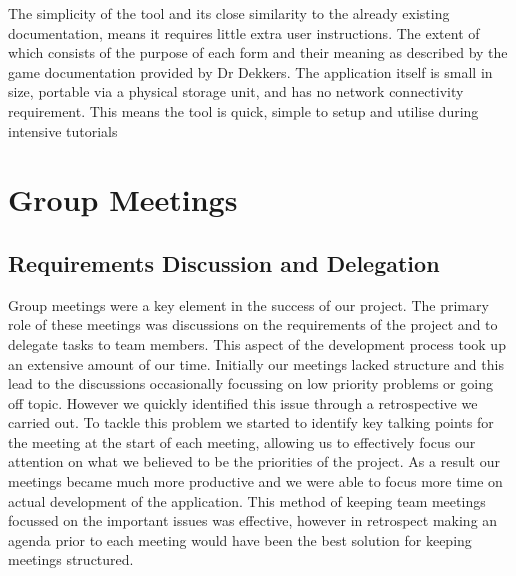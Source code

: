 \documentclass{l3proj}
\begin{document}
The simplicity of the tool and its close similarity to the already existing documentation, means it requires little extra user instructions. The extent of which consists of the purpose of each form and their meaning as described by the game documentation provided by Dr Dekkers. The application itself is small in size, portable via a physical storage unit, and has no network connectivity requirement. This means the tool is quick, simple to setup and utilise during intensive tutorials
\section{Group Meetings}
\label{sec:groupmeetings}
\subsection{Requirements Discussion and Delegation}
Group meetings were a key element in the success of our project. The primary role of these meetings was discussions on the requirements of the project and to delegate tasks to team members. This aspect of the development process took up an extensive amount of our time. Initially our meetings lacked structure and this lead to the discussions occasionally focussing on low priority problems or going off topic. However we quickly identified this issue through a retrospective we carried out. To tackle this problem we started to identify key talking points for the meeting at the start of each meeting, allowing us to effectively focus our attention on what we believed to be the priorities of the project. As a result our meetings became much more productive and we were able to focus more time on actual development of the application. This method of keeping team meetings focussed on the important issues was effective, however in retrospect making an agenda prior to each meeting would have been the best solution for keeping meetings structured.
\end{document}
